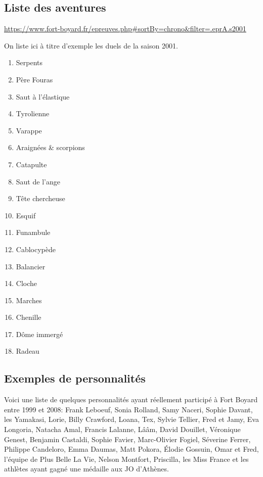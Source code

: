 \documentclass[french,twocolumn,twoside]{article}
\newcommand\info{{\faInfo}\xspace}
\newcommand\bulb{{\faLightbulbO}\xspace}
\newcommand\fist{{\faHandRockO}\xspace}
\begin{document}
\subsection*{Liste des aventures \info}
\url{https://www.fort-boyard.fr/epreuves.php#sortBy=chrono&filter=.eprA.s2001}

On liste ici à titre d'exemple les duels de la saison 2001.

\begin{minipage}{0.54\textwidth}
\begin{multicols}{2}
\begin{enumerate}
	\item Serpents \bulb
	\item Père Fouras \bulb
	\item Saut à l'élastique \fist
	\item Tyrolienne \fist
	\item Varappe \fist
	\item Araignées \& scorpions \bulb
	\item Catapulte \fist
	\item Saut de l'ange \fist
	\item Tête chercheuse \bulb
	\item Esquif \fist
	\item Funambule \fist
	\item Cablocypède \fist
	\item Balancier \fist
	\item Cloche \fist
	\item Marches \fist
	\item Chenille \fist
	\item Dôme immergé \fist
	\item Radeau \fist
\end{enumerate}
\end{multicols}
\end{minipage}

\subsection*{Exemples de personnalités}

Voici une liste de quelques personnalités ayant réellement participé à Fort Boyard entre 1999 et 2008: Frank Leboeuf, Sonia Rolland, Samy Naceri, Sophie Davant, les Yamakasi, Lorie, Billy Crawford, Loana, Tex, Sylvie Tellier, Fred et Jamy, Eva Longoria, Natacha Amal, Francis Lalanne, Lââm, David Douillet, Véronique Genest, Benjamin Castaldi, Sophie Favier, Marc-Olivier Fogiel, Séverine Ferrer, Philippe Candeloro, Emma Daumas, Matt Pokora, Élodie Gossuin, Omar et Fred, l'équipe de Plus Belle La Vie, Nelson Montfort, Priscilla, les Miss France et les athlètes ayant gagné une médaille aux JO d'Athènes.
\end{document}
